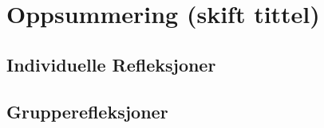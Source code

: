 \chapter{Oppsummering (skift tittel)}

\section{Individuelle Refleksjoner}

\section{Grupperefleksjoner}